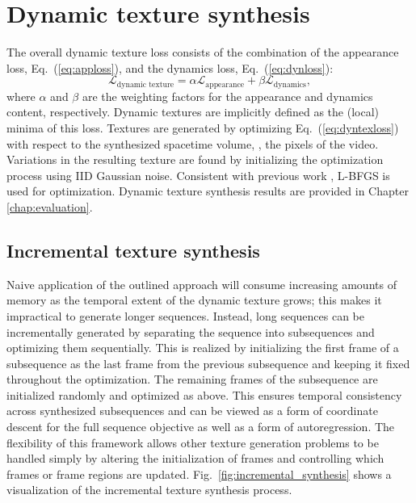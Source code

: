\section{Dynamic texture synthesis}\label{sec:texgen}
The overall dynamic texture loss consists of the combination of the appearance loss, Eq.\ (\ref{eq:apploss}),
and the dynamics loss, Eq.\ (\ref{eq:dynloss}):
\begin{equation}
   \mathcal{L}_\text{dynamic texture} = \alpha\mathcal{L}_\text{appearance} + \beta \mathcal{L}_\text{dynamics}, \label{eq:dyntexloss}
\end{equation}
where $\alpha$ and $\beta$ are the weighting factors for the
appearance and dynamics content, respectively.
Dynamic textures are implicitly defined as the (local) minima 
of this loss.
Textures are generated by optimizing Eq.\ 
(\ref{eq:dyntexloss}) with respect to the synthesized spacetime volume,
\ie, the pixels of the video.
Variations in the resulting texture are found by initializing the
optimization process using IID Gaussian noise.
Consistent with previous work \cite{gatys2015}, L-BFGS \cite{liu1989} is used for optimization. Dynamic texture synthesis results are provided in Chapter \ref{chap:evaluation}.

\subsection{Incremental texture synthesis}\label{sec:incremental_synthesis}

Naive application of the outlined approach will consume
increasing amounts of memory as the temporal extent of the 
dynamic texture grows; this makes it impractical to generate
longer sequences.
Instead, long sequences can be incrementally generated by
separating the sequence into subsequences and optimizing them 
sequentially. This is realized by initializing the first frame of a subsequence as the last 
frame from the previous subsequence and keeping it fixed throughout
the optimization.
The remaining frames of the subsequence are initialized randomly and
optimized as above.
This ensures temporal consistency across synthesized subsequences
and can be viewed as a form of coordinate descent for the full
sequence objective as well as a form of autoregression.
The flexibility of this framework allows other texture generation
problems to be handled simply by altering the 
initialization of frames and controlling which
frames or frame regions are updated. Fig.\ \ref{fig:incremental_synthesis}
shows a visualization of the incremental texture synthesis process.

